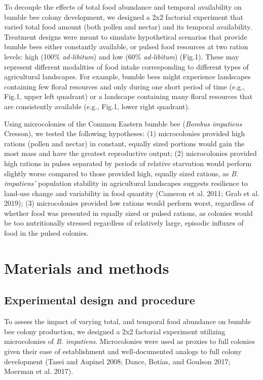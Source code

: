 \documentclass[11pt,]{article}
\begin{document}
To decouple the effects of total food abundance and temporal
availability on bumble bee colony development, we designed a 2x2
factorial experiment that varied total food amount (both pollen and
nectar) and its temporal availability. Treatment designs were meant to
simulate hypothetical scenarios that provide bumble bees either
constantly available, or pulsed food resources at two ration levels:
high (100\% \emph{ad-libitum}) and low (60\% \emph{ad-libitum}) (Fig.1).
These may represent different modalities of food intake corresponding to
different types of agricultural landscapes. For example, bumble bees
might experience landscapes containing few floral resources and only
during one short period of time (e.g., Fig.1, upper left quadrant) or a
landscape containing many floral resources that are consistently
available (e.g., Fig.1, lower right quadrant).

Using microcolonies of the Common Eastern bumble bee (\emph{Bombus
impatiens} Cresson), we tested the following hypotheses: (1)
microcolonies provided high rations (pollen and nectar) in constant,
equally sized portions would gain the most mass and have the greatest
reproductive output; (2) microcolonies provided high rations in pulses
separated by periods of relative starvation would perform slightly worse
compared to those provided high, equally sized rations, as \emph{B.
impatiens'} population stability in agricultural landscapes suggests
resilience to land-use change and variability in food quantity (Cameron
et al. 2011; Grab et al. 2019); (3) microcolonies provided low rations
would perform worst, regardless of whether food was presented in equally
sized or pulsed rations, as colonies would be too nutritionally stressed
regardless of relatively large, episodic influxes of food in the pulsed
colonies.

\hypertarget{materials-and-methods}{%
\section{Materials and methods}\label{materials-and-methods}}

\hypertarget{experimental-design-and-procedure}{%
\subsection{Experimental design and
procedure}\label{experimental-design-and-procedure}}

To assess the impact of varying total, and temporal food abundance on
bumble bee colony production, we designed a 2x2 factorial experiment
utilizing microcolonies of \emph{B. impatiens}. Microcolonies were used
as proxies to full colonies given their ease of establishment and
well-documented analogs to full colony development (Tasei and Aupinel
2008; Dance, Botías, and Goulson 2017; Moerman et al. 2017).
\end{document}
